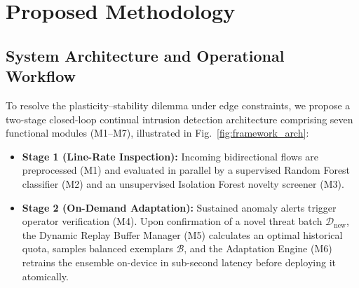 \documentclass[conference]{IEEEtran}
\begin{document}
\section{Proposed Methodology}
\label{sec:proposed_methodology}

\subsection{System Architecture and Operational Workflow}
To resolve the plasticity--stability dilemma under edge constraints, we propose a two-stage closed-loop continual intrusion detection architecture comprising seven functional modules (M1--M7), illustrated in Fig.~\ref{fig:framework_arch}:
\begin{itemize}
    \item \textbf{Stage 1 (Line-Rate Inspection):} Incoming bidirectional flows are preprocessed (M1) and evaluated in parallel by a supervised Random Forest classifier (M2) and an unsupervised Isolation Forest novelty screener (M3).
    \item \textbf{Stage 2 (On-Demand Adaptation):} Sustained anomaly alerts trigger operator verification (M4). Upon confirmation of a novel threat batch $\mathcal{D}_{\text{new}}$, the Dynamic Replay Buffer Manager (M5) calculates an optimal historical quota, samples balanced exemplars $\mathcal{B}$, and the Adaptation Engine (M6) retrains the ensemble on-device in sub-second latency before deploying it atomically.
\end{itemize}
\end{document}
